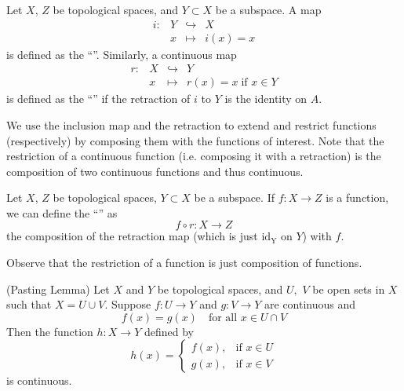 \begin{defn}
Let $X$, $Z$ be topological spaces, and $Y\subset X$ be a subspace. A
map
\begin{equation}
\begin{array}{llll}
i:& Y & \hookrightarrow& X\\
  & x & \mapsto& i(x)=x
\end{array}
\end{equation}
is defined as the ``''. Similarly, a continuous map
\begin{equation}
\begin{array}{llll}
r:& X & \hookrightarrow& Y\\
  & x & \mapsto& r(x)=x\;\text{if }x\in Y
\end{array}
\end{equation}
is defined as the ``'' if the retraction of $i$ to
$Y$ is the identity on $A$.
\end{defn}
\begin{rmk}
We use the inclusion map and the retraction to extend and restrict
functions (respectively) by composing them with the functions of
interest. Note that the restriction of a continuous function
(i.e. composing it with a retraction) is the composition of two
continuous functions and thus continuous.
\end{rmk}
\begin{defn}
Let $X$, $Z$ be topological spaces, $Y\subset X$ be a subspace.
If $f:X\to Z$ is a function, we can define the ``'' as
\begin{equation}
f\circ r:X\to Z
\end{equation}
the composition of the retraction map (which is just
$\operatorname{id_Y}$ on $Y$) with $f$. 
\end{defn}
\begin{rmk}
Observe that the restriction of a function is just composition of
functions.
\end{rmk}
\begin{lem}{(Pasting Lemma)}
Let $X$ and $Y$ be topological spaces, and $U,$ $V$ be open sets in
$X$ such that $X=U\cup V$. Suppose $f:U\to Y$ and $g:V\to Y$ are
continuous and 
\begin{equation}
f(x)=g(x)\quad\text{for all }x\in U\cap V
\end{equation}
Then the function $h:X\to Y$ defined by
\begin{equation}
h(x) = \begin{cases} f(x),&\text{if }x\in U\\
g(x),&\text{if }x\in V
\end{cases}
\end{equation}
is continuous.
\end{lem}
